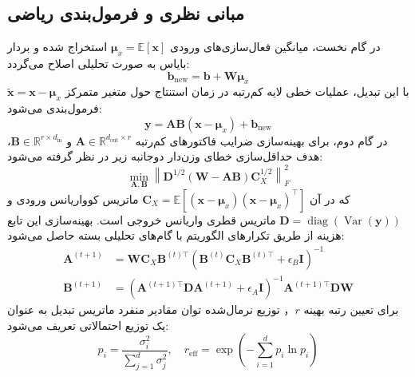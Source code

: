 \subsection{مبانی نظری و فرمول‌بندی ریاضی}
در گام نخست، میانگین فعال‌سازی‌های ورودی $\boldsymbol{\mu}_x = \mathbb{E}[\mathbf{x}]$ استخراج شده و بردار بایاس به صورت تحلیلی اصلاح می‌گردد:
\begin{equation}
\mathbf{b}_{\text{new}} = \mathbf{b} + \mathbf{W} \boldsymbol{\mu}_x
\end{equation}
با این تبدیل، عملیات خطی لایه کم‌رتبه در زمان استنتاج حول متغیر متمرکز $\tilde{\mathbf{x}} = \mathbf{x} - \boldsymbol{\mu}_x$ فرمول‌بندی می‌شود:
\begin{equation}
\mathbf{y} = \mathbf{A}\mathbf{B} (\mathbf{x} - \boldsymbol{\mu}_x) + \mathbf{b}_{\text{new}}
\end{equation}
در گام دوم، برای بهینه‌سازی ضرایب فاکتورهای کم‌رتبه $\mathbf{A} \in \mathbb{R}^{d_{\text{out}} \times r}$ و $\mathbf{B} \in \mathbb{R}^{r \times d_{\text{in}}}$، هدف حداقل‌سازی خطای وزن‌دار دوجانبه زیر در نظر گرفته می‌شود:
\begin{equation}
\min_{\mathbf{A}, \mathbf{B}} \left\| \mathbf{D}^{1/2} (\mathbf{W} - \mathbf{A}\mathbf{B}) \mathbf{C}_X^{1/2} \right\|_F^2
\end{equation}
که در آن $\mathbf{C}_X = \mathbb{E}[(\mathbf{x} - \boldsymbol{\mu}_x)(\mathbf{x} - \boldsymbol{\mu}_x)^\top]$ ماتریس کوواریانس ورودی و $\mathbf{D} = \operatorname{diag}(\operatorname{Var}(\mathbf{y}))$ ماتریس قطری واریانس خروجی است. بهینه‌سازی این تابع هزینه از طریق تکرارهای الگوریتم  با گام‌های تحلیلی بسته حاصل می‌شود:
\begin{align}
\mathbf{A}^{(t+1)} &= \mathbf{W} \mathbf{C}_X \mathbf{B}^{(t)\top} \left( \mathbf{B}^{(t)} \mathbf{C}_X \mathbf{B}^{(t)\top} + \epsilon_B \mathbf{I} \right)^{-1} \\
\mathbf{B}^{(t+1)} &= \left( \mathbf{A}^{(t+1)\top} \mathbf{D} \mathbf{A}^{(t+1)} + \epsilon_A \mathbf{I} \right)^{-1} \mathbf{A}^{(t+1)\top} \mathbf{D} \mathbf{W}
\end{align}
برای تعیین رتبه بهینه $r$， توزیع نرمال‌شده توان مقادیر منفرد ماتریس تبدیل به عنوان یک توزیع احتمالاتی تعریف می‌شود:
\begin{equation}
p_i = \frac{\sigma_i^2}{\sum_{j=1}^d \sigma_j^2}, \quad r_{\text{eff}} = \exp\left( - \sum_{i=1}^d p_i \ln p_i \right)
\end{equation}

